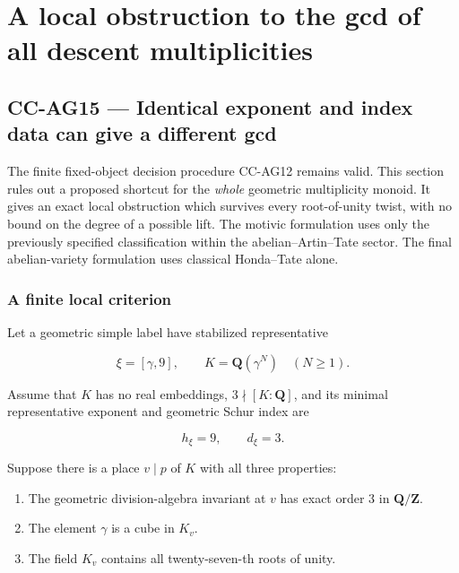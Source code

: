 \section{A local obstruction to the gcd of all descent
multiplicities}\label{a-local-obstruction-to-the-gcd-of-all-descent-multiplicities}

\subsection{CC-AG15 --- Identical exponent and index data can give a
different
gcd}\label{cc-ag15-identical-exponent-and-index-data-can-give-a-different-gcd}

The finite fixed-object decision procedure CC-AG12 remains valid. This
section rules out a proposed shortcut for the \emph{whole} geometric
multiplicity monoid. It gives an exact local obstruction which survives
every root-of-unity twist, with no bound on the degree of a possible
lift. The motivic formulation uses only the previously specified
classification within the abelian--Artin--Tate sector. The final
abelian-variety formulation uses classical Honda--Tate alone.

\subsubsection{A finite local criterion}\label{a-finite-local-criterion}

Let a geometric simple label have stabilized representative

\[
 \xi=[\gamma,9],\qquad
 K=\mathbf Q(\gamma^N)\quad(N\ge1).
 \tag{CC-AG.126}
\]

Assume that \(K\) has no real embeddings, \(3\nmid[K:\mathbf Q]\), and
its minimal representative exponent and geometric Schur index are

\[
 h_\xi=9,\qquad d_\xi=3.
 \tag{CC-AG.127}
\]

Suppose there is a place \(v\mid p\) of \(K\) with all three properties:

\begin{enumerate}
\def\labelenumi{\arabic{enumi}.}
\tightlist
\item
  The geometric division-algebra invariant at \(v\) has exact order
  \(3\) in \(\mathbf Q/\mathbf Z\).
\item
  The element \(\gamma\) is a cube in \(K_v\).
\item
  The field \(K_v\) contains all twenty-seven-th roots of unity.
\end{enumerate}

